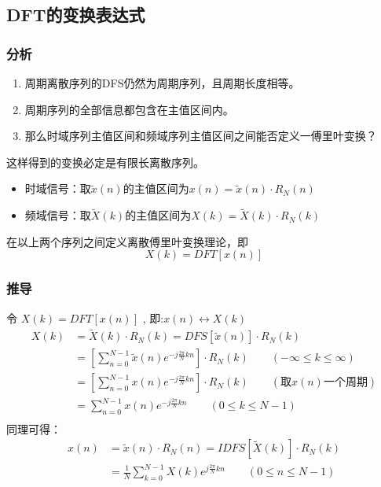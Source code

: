 \documentclass[notheorems,compress,mathserif,table]{beamer}
\begin{document}
\subsection{DFT的变换表达式}
\begin{frame}\frametitle{分析}%
\begin{enumerate}
  \item 周期离散序列的DFS仍然为周期序列，且周期长度相等。
  \item 周期序列的全部信息都包含在主值区间内。
  \item 那么时域序列主值区间和频域序列主值区间之间能否定义一傅里叶变换？
\end{enumerate}
这样得到的变换必定是有限长离散序列。
\newline
    \begin{itemize}
      \item 时域信号：取$\tilde{x}(n)$的主值区间为$x(n) =\tilde{x}(n)\cdot R_N(n)$
      \item 频域信号：取$\tilde{X}(k)$的主值区间为$X(k) =\tilde{X}(k)\cdot R_N(k)$
    \end{itemize}

    在以上两个序列之间定义离散傅里叶变换理论，即
     $$X(k) = DFT[x(n)]$$ %
\end{frame}

\begin{frame}[shrink]\frametitle{推导}%
    令 $X(k) = DFT[x(n)]$ , \quad 即:$x(n)\longleftrightarrow X(k)$
    \begin{equation*}
    \begin{split}
    X(k) &= \tilde{X}(k)\cdot R_N(k) =  DFS[\tilde{x}(n)]\cdot R_N(k)\\
         &= \left[\sum_{n=0}^{N-1}\tilde{x}(n)e^{-j\frac{2\pi}{N}kn}\right]\cdot R_N(k)\quad\quad (-\infty \leq k \leq \infty)\\
         &= \left[\sum_{n=0}^{N-1}x(n)e^{-j\frac{2\pi}{N}kn}\right]\cdot R_N(k)\quad\quad (\mbox{取$x(n)$一个周期})\\
         &= \sum_{n=0}^{N-1}x(n)e^{-j\frac{2\pi}{N}kn} \quad\quad (0 \leq k \leq N-1)\\
    \end{split}
    \end{equation*}
    同理可得：
    \begin{equation*}
    \begin{split}
    x(n) &= \tilde{x}(n)\cdot R_N(n) =  IDFS[\tilde{X}(k)]\cdot R_N(k)\\
         &= \frac{1}{N}\sum_{k=0}^{N-1}X(k)e^{j\frac{2\pi}{N}kn} \quad\quad (0 \leq n \leq N-1)
    \end{split}
    \end{equation*}
\end{frame}
\end{document}
